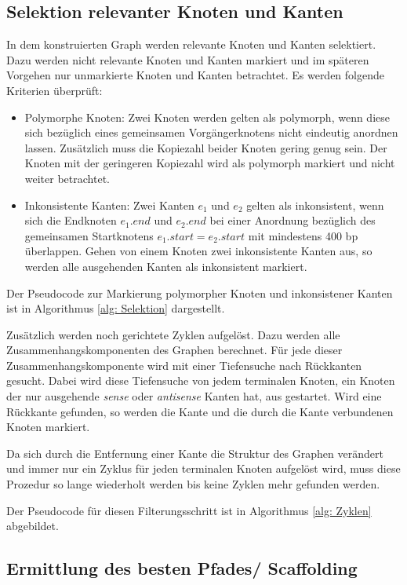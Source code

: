\documentclass[a4paper,10pt,parskip]{scrartcl}
\begin{document}
\subsection{Selektion relevanter Knoten und Kanten}
In dem konstruierten Graph werden relevante Knoten und Kanten
selektiert. Dazu werden nicht relevante Knoten und Kanten markiert und
im späteren Vorgehen nur unmarkierte Knoten und Kanten betrachtet. Es
werden folgende Kriterien überprüft:
\begin{itemize}
\item Polymorphe Knoten: Zwei Knoten werden gelten als polymorph, wenn
  diese sich bezüglich eines gemeinsamen Vorgängerknotens nicht
  eindeutig anordnen lassen. Zusätzlich muss die Kopiezahl beider
  Knoten gering genug sein. Der Knoten mit der geringeren Kopiezahl
  wird als polymorph markiert und nicht weiter betrachtet.
\item Inkonsistente Kanten: Zwei Kanten $e_1$ und $e_2$ gelten als
  inkonsistent, wenn sich die Endknoten $e_1.end$ und $e_2.end$ bei
  einer Anordnung bezüglich des gemeinsamen Startknotens $e_1.start =
  e_2.start$ mit mindestens 400 bp überlappen. Gehen von einem Knoten
  zwei inkonsistente Kanten aus, so werden alle ausgehenden Kanten als
  inkonsistent markiert.
\end{itemize}
Der Pseudocode zur Markierung polymorpher Knoten und inkonsistener
Kanten ist in Algorithmus \ref{alg: Selektion} dargestellt.

Zusätzlich werden noch gerichtete Zyklen aufgelöst. Dazu werden alle
Zusammenhangskomponenten des Graphen berechnet. Für jede dieser
Zusammenhangskomponente wird mit einer Tiefensuche nach Rückkanten
gesucht. Dabei wird diese Tiefensuche von jedem terminalen Knoten, ein
Knoten der nur ausgehende \textit{sense} oder \textit{antisense}
Kanten hat, aus gestartet. Wird eine Rückkante gefunden, so werden die
Kante und die durch die Kante verbundenen Knoten markiert.

Da sich durch die Entfernung einer Kante die Struktur des Graphen
verändert und immer nur ein Zyklus für jeden terminalen Knoten
aufgelöst wird, muss diese Prozedur so lange wiederholt werden bis
keine Zyklen mehr gefunden werden.

Der Pseudocode für diesen Filterungsschritt ist in Algorithmus
\ref{alg: Zyklen} abgebildet.

\subsection{Ermittlung des besten Pfades/ Scaffolding}
\end{document}
